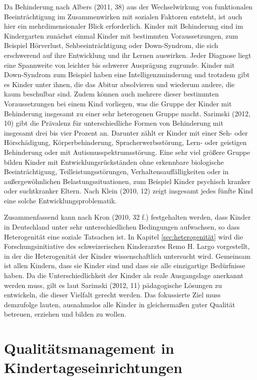 Da Behinderung nach Albers (2011, 38) aus der Wechselwirkung von funktionalen Beeinträchtigung im Zusammenwirken mit sozialen Faktoren entsteht, ist auch hier ein mehrdimensionaler Blick erforderlich. Kinder mit Behinderung sind im Kindergarten zunächst einmal Kinder mit bestimmten Voraussetzungen, zum Beispiel Hörverlust, Sehbeeinträchtigung oder Down-Syndrom, die sich erschwerend auf ihre Entwicklung und ihr Lernen auswirken. Jeder Diagnose liegt eine Spannweite von leichter bis schwerer Ausprägung zugrunde. Kinder mit Down-Syndrom zum Beispiel haben eine Intelligenzminderung und trotzdem gibt es Kinder unter ihnen, die das Abitur absolvieren und wiederum andere, die kaum beschulbar sind. Zudem können auch mehrere dieser bestimmten Voraussetzungen bei einem Kind vorliegen, was die Gruppe der Kinder mit Behinderung insgesamt zu einer sehr heterogenen Gruppe macht. Sarimski (2012, 10) gibt die Prävalenz für unterschiedliche Formen von Behinderung mit insgesamt drei bis vier Prozent an. Darunter zählt er Kinder mit einer Seh- oder Hörschädigung, Körperbehinderung, Spracherwerbsstörung, Lern- oder geistigen Behinderung oder mit Autismusspektrumsstörung. 
Eine sehr viel größere Gruppe bilden Kinder mit Entwicklungsrückständen ohne erkennbare biologische Beeinträchtigung, Teilleistungsstörungen, Verhaltensauffälligkeiten oder in außergewöhnlichen Belastungssituationen, zum Beispiel Kinder psychisch kranker oder suchtkranker Eltern. Nach Klein (2010, 12) zeigt insgesamt jedes fünfte Kind eine solche Entwicklungsproblematik. 

Zusammenfassend kann nach Kron (2010, 32 f.) festgehalten werden, dass Kinder in Deutschland unter sehr unterschiedlichen Bedingungen aufwachsen, so dass Heterogenität eine soziale Tatsachen ist. In Kapitel \ref{sec:heterogenität} wird die Forschungsinitiative des schweizerischen Kinderarztes Remo H. Largo vorgestellt, in der die Heterogenität der Kinder wissenschaftlich untersucht wird. 
Gemeinsam ist allen Kindern, dass sie Kinder sind und dass sie alle einzigartige Bedürfnisse haben. 
Da die Unterschiedlichkeit der Kinder als reale Ausgangslage anerkannt werden muss, gilt es laut Sarimski (2012, 11) pädagogische Lösungen zu entwickeln, die dieser Vielfalt gerecht werden. Das fokussierte Ziel muss demzufolge lauten, ausnahmslos alle Kinder in gleichermaßen guter Qualität betreuen, erziehen und bilden zu wollen.  


\section{Qualitätsmanagement in Kindertageseinrichtungen}

